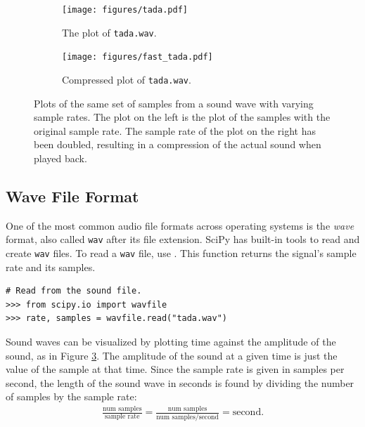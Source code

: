 \begin{figure}[H]
\captionsetup[subfigure]{justification=centering}
\centering
\begin{subfigure}{.4\textwidth}
    \centering
    \texttt{[image: figures/tada.pdf]}
    \caption{The plot of \texttt{tada.wav}.}
    \label{fig:DFT_tada}
\end{subfigure}
\qquad
\begin{subfigure}{.4\textwidth}
    \centering
    \texttt{[image: figures/fast\_tada.pdf]}
    \caption{Compressed plot of \texttt{tada.wav}.}
    \label{fig:DFT_fasttada}
\end{subfigure}
\caption{Plots of the same set of samples from a sound wave with varying sample rates.
The plot on the left is the plot of the samples with the original sample rate.
The sample rate of the plot on the right has been doubled, resulting in a compression of the actual sound when played back.}
\label{fig:DFT_comp_wave}
\end{figure}

\subsection*{Wave File Format} %

One of the most common audio file formats across operating systems is the \emph{wave} format, also called \texttt{wav} after its file extension.
SciPy has built-in tools to read and create \texttt{wav} files.
To read a \texttt{wav} file, use .
This function returns the signal's sample rate and its samples.

\begin{lstlisting}
# Read from the sound file.
>>> from scipy.io import wavfile
>>> rate, samples = wavfile.read("tada.wav")
\end{lstlisting}

Sound waves can be visualized by plotting time against the amplitude of the sound, as in Figure \ref{fig:DFT_comp_wave}.
The amplitude of the sound at a given time is just the value of the sample at that time.
Since the sample rate is given in samples per second, the length of the sound wave in seconds is found by dividing the number of samples by the sample rate:
\begin{align}
\label{eq:dft-xaxis-time}
\frac{\mbox{num samples}}{\mbox{sample rate}}
= \frac{\mbox{num samples}}{\mbox{num samples/second}}
= \mbox{second.}
\end{align}

